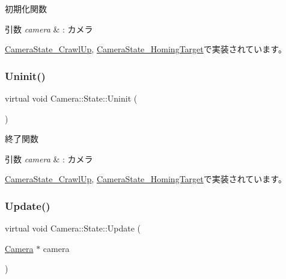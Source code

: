 初期化関数 


\begin{DoxyParams}{引数}
{\em camera} & \+: カメラ \\
\hline
\end{DoxyParams}


\mbox{\hyperlink{class_camera_state___crawl_up_a43a47eb4e7445c6801e8316c5a635709}{Camera\+State\+\_\+\+Crawl\+Up}}, \mbox{\hyperlink{class_camera_state___homing_target_a9222190a5f26d564e99623b05941d382}{Camera\+State\+\_\+\+Homing\+Target}}で実装されています。

\mbox{\label{class_camera_1_1_state_adb3f43b6c3f8100da7877867180e804b}} 
\subsubsection{\texorpdfstring{Uninit()}{Uninit()}}
{\footnotesize\ttfamily virtual void Camera\+::\+State\+::\+Uninit (\begin{DoxyParamCaption}{ }\end{DoxyParamCaption})\hspace{0.3cm}{\ttfamily [pure virtual]}}



終了関数 


\begin{DoxyParams}{引数}
{\em camera} & \+: カメラ \\
\hline
\end{DoxyParams}


\mbox{\hyperlink{class_camera_state___crawl_up_a046ec18a91e31b210ae000133fa6113a}{Camera\+State\+\_\+\+Crawl\+Up}}, \mbox{\hyperlink{class_camera_state___homing_target_ab2b5379b35ebafc53189bf4d45646c8c}{Camera\+State\+\_\+\+Homing\+Target}}で実装されています。

\mbox{\label{class_camera_1_1_state_a2d41e0cb783666bae6c6ea167fcc7874}} 
\subsubsection{\texorpdfstring{Update()}{Update()}}
{\footnotesize\ttfamily virtual void Camera\+::\+State\+::\+Update (\begin{DoxyParamCaption}\item[{\mbox{\hyperlink{class_camera}{Camera}} $\ast$}]{camera }\end{DoxyParamCaption})\hspace{0.3cm}{\ttfamily [pure virtual]}}



